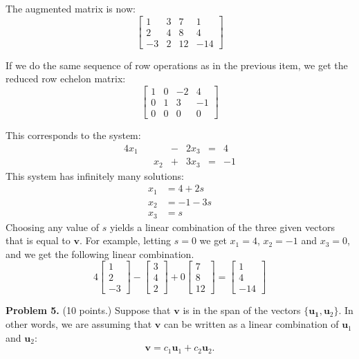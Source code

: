 \documentclass[12pt]{article}
\begin{document}
The augmented matrix is now:
\[\left[\begin{matrix}1 & 3 & 7 & 1\\2 & 4 & 8 & 4\\-3 & 2 & 12 & -14\end{matrix}\right]\]

If we do the same sequence of row operations as in the previous item, we get the reduced row echelon matrix:
\[\left[\begin{matrix}1 & 0 & -2 & 4\\0 & 1 & 3 & -1\\0 & 0 & 0 & 0\end{matrix}\right]\]

This corresponds to the system:
\begin{alignat*}{4}
x_1 & {}{} &     & {}-{} & 2x_3 & {}={} & 4\\
    & {}{} & x_2 & {}+{} & 3x_3 & {}={} & -1
\end{alignat*}
This system has infinitely many solutions:
\begin{align*}
x_1 &= 4 + 2s\\
x_2 &= -1 - 3s\\
x_3 &=   s
\end{align*}
Choosing any value of $s$ yields a linear combination of the three given vectors that is equal to $\mathbf{v}$. For example, letting $s=0$ we get $x_1=4$, $x_2=-1$ and $x_3=0$, and we get the following linear combination.
\[
4\left[\begin{matrix}  1 \\ 2\\ -3\end{matrix}\right]
-\left[\begin{matrix}  3 \\ 4\\  2\end{matrix}\right]+
0\left[\begin{matrix} 7 \\ 8\\ 12\end{matrix}\right]=
\left[\begin{matrix}1\\4\\-14\end{matrix}\right]
\]


\textbf{Problem 5.} (10 points.) Suppose that $\mathbf{v}$ is in the span of the vectors $\{\mathbf{u_1},\mathbf{u}_2\}$. In other words, we are assuming that $\mathbf{v}$ can be written as a linear combination of $\mathbf{u}_1$ and $\mathbf{u}_2$:
\[
\mathbf{v}=c_1\mathbf{u}_1+c_2\mathbf{u}_2.
\]
\end{document}
